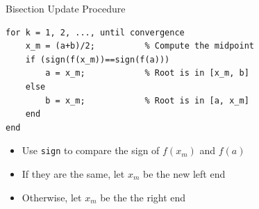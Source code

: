\documentclass[10pt]{beamer}
\begin{document}
\begin{frame}[fragile]{Bisection Update Procedure}
\begin{lstlisting}[mathescape, label=algo:bisection]
% user provides a and b such that sign(f(a)) != sign(f(b))
for k = 1, 2, ..., until convergence
    x_m = (a+b)/2;          % Compute the midpoint
    if (sign(f(x_m))==sign(f(a)))
        a = x_m;            % Root is in [x_m, b]
    else
        b = x_m;            % Root is in [a, x_m]
    end
end
\end{lstlisting}
\vspace{2mm}
\begin{itemize}
    \item Use \texttt{sign} to compare the sign of $f(x_m)$ and $f(a)$
    \item If they are the same, let $x_m$ be the new left end
    \item Otherwise, let $x_m$ be the the right end
\end{itemize}
\end{frame}
\end{document}
